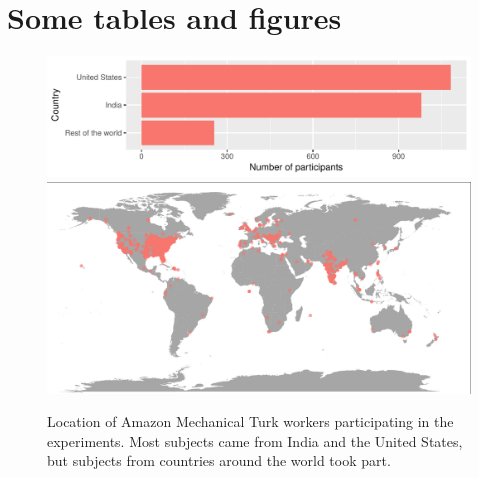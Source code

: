 \documentclass[10pt]{article}\usepackage[]{graphicx}\usepackage[]{xcolor}
\begin{document}
\section{Some tables and figures}\label{sec:tbl_fig}

\begin{figure}[htbp] 
   \centering
   \includegraphics[width=4.5in]{turker_country.pdf} 
   \includegraphics[width=4.5in]{turker_location.pdf}    
   \caption{Location of Amazon Mechanical Turk workers participating in the experiments. Most subjects came from India and the United States, but subjects from countries around the world took part.}
   \label{fig:turker_location}
\end{figure}
\end{document}
